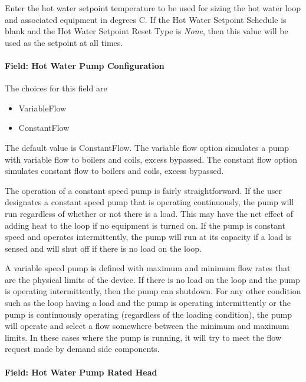 Enter the hot water setpoint temperature to be used for sizing the hot water loop and associated equipment in degrees C. If the Hot Water Setpoint Schedule is blank and the Hot Water Setpoint Reset Type is \emph{None}, then this value will be used as the setpoint at all times.

\paragraph{Field: Hot Water Pump Configuration}\label{field-hot-water-pump-configuration}

The choices for this field are

\begin{itemize}
\item
  VariableFlow
\item
  ConstantFlow
\end{itemize}

The default value is ConstantFlow. The variable flow option simulates a pump with variable flow to boilers and coils, excess bypassed. The constant flow option simulates constant flow to boilers and coils, excess bypassed.

The operation of a constant speed pump is fairly straightforward. If the user designates a constant speed pump that is operating continuously, the pump will run regardless of whether or not there is a load. This may have the net effect of adding heat to the loop if no equipment is turned on. If the pump is constant speed and operates intermittently, the pump will run at its capacity if a load is sensed and will shut off if there is no load on the loop.

A variable speed pump is defined with maximum and minimum flow rates that are the physical limits of the device. If there is no load on the loop and the pump is operating intermittently, then the pump can shutdown. For any other condition such as the loop having a load and the pump is operating intermittently or the pump is continuously operating (regardless of the loading condition), the pump will operate and select a flow somewhere between the minimum and maximum limits. In these cases where the pump is running, it will try to meet the flow request made by demand side components.

\paragraph{Field: Hot Water Pump Rated Head}\label{field-hot-water-pump-rated-head}

